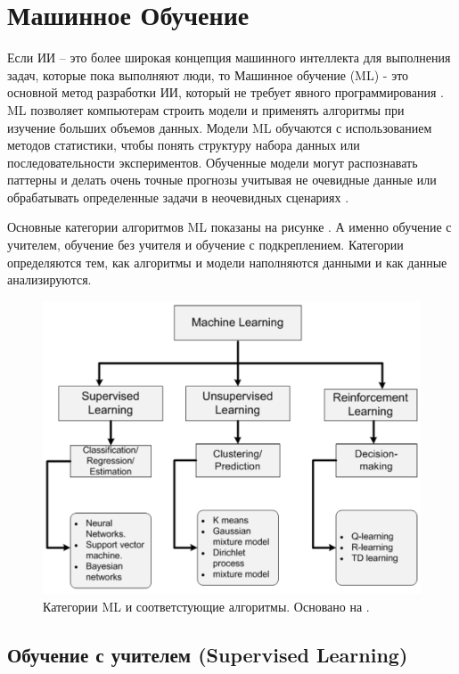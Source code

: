 \section{Машинное Обучение} \label{ch1:ml}

Если ИИ – это более широкая концепция машинного интеллекта для выполнения задач, которые пока выполняют люди, то Машинное обучение (ML) - это основной метод разработки ИИ, который не требует явного программирования \cite{Samuel-SomeStudies}. ML позволяет компьютерам строить модели и применять алгоритмы при изучение больших объемов данных. Модели ML обучаются с использованием методов статистики, чтобы понять структуру набора данных или последовательности экспериментов. Обученные модели могут распознавать паттерны и делать очень точные прогнозы учитывая не очевидные данные или обрабатывать определенные задачи в неочевидных сценариях \cite{bishop06pattern}.

Основные категории алгоритмов ML показаны на рисунке . А именно обучение с учителем, обучение без учителя и обучение с подкреплением.
Категории определяются тем, как алгоритмы и модели наполняются данными и как данные анализируются.

\begin{figure}[ht!] 
	\center
	\includegraphics [scale=0.60] {my_folder/images/ch1/ML-categories.png}
	\caption{Категории ML и соответстующие алгоритмы. Основано на \cite{Sultan_2018}.} 
	\label{fig:ch1-ML-categories}
\end{figure}


\subsection{Обучение с учителем (Supervised Learning)}

